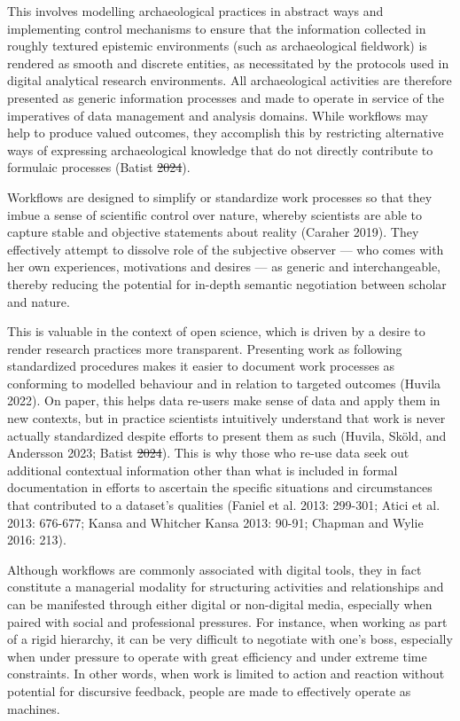 \documentclass[
]{article}
\makeatletter
\providecommand{\DIFadd}[1]{{\protect\color{blue}\uwave{#1}}} %
\providecommand{\DIFdel}[1]{{\protect\color{red}\sout{#1}}} %
\providecommand{\DIFaddbegin}{} %
\providecommand{\DIFaddend}{} %
\providecommand{\DIFdelbegin}{} %
\providecommand{\DIFdelend}{} %
\newcommand{\DIFscaledelfig}{0.5}
\newlength{\DIFdelgraphicswidth} %
\newlength{\DIFdelgraphicsheight} %
\newcommand{\DIFaddincludegraphics}[2][]{{\color{blue}\fbox{\DIFOincludegraphics[#1]{#2}}}} %
\newcommand{\DIFdelincludegraphics}[2][]{%
\sbox{\DIFdelgraphicsbox}{\DIFOincludegraphics[#1]{#2}}%
\settoboxwidth{\DIFdelgraphicswidth}{\DIFdelgraphicsbox} %
\settoboxtotalheight{\DIFdelgraphicsheight}{\DIFdelgraphicsbox} %
\scalebox{\DIFscaledelfig}{%
\parbox[b]{\DIFdelgraphicswidth}{\usebox{\DIFdelgraphicsbox}\\[-\baselineskip] \rule{\DIFdelgraphicswidth}{0em}}\llap{\resizebox{\DIFdelgraphicswidth}{\DIFdelgraphicsheight}{%
\setlength{\unitlength}{\DIFdelgraphicswidth}%
\begin{picture}(1,1)%
\thicklines\linethickness{2pt} %
{\color[rgb]{1,0,0}\put(0,0){\framebox(1,1){}}}%
{\color[rgb]{1,0,0}\put(0,0){\line( 1,1){1}}}%
{\color[rgb]{1,0,0}\put(0,1){\line(1,-1){1}}}%
\end{picture}%
}\hspace*{3pt}}} %
} %
\DeclareRobustCommand{\DIFaddbegin}{\DIFOaddbegin \let\includegraphics\DIFaddincludegraphics} %
\DeclareRobustCommand{\DIFaddend}{\DIFOaddend \let\includegraphics\DIFOincludegraphics} %
\DeclareRobustCommand{\DIFdelbegin}{\DIFOdelbegin \let\includegraphics\DIFdelincludegraphics} %
\DeclareRobustCommand{\DIFdelend}{\DIFOaddend \let\includegraphics\DIFOincludegraphics} %
\let\sout@orig\sout %
\renewcommand{\sout}[1]{\ifmmode\text{\sout@orig{\ensuremath{#1}}}\else\sout@orig{#1}\fi} %
\makeatother
\begin{document}
This involves modelling archaeological practices in abstract ways and
implementing control mechanisms to ensure that the information collected
in roughly textured epistemic environments (such as archaeological
fieldwork) is rendered as smooth and discrete entities, as necessitated
by the protocols used in digital analytical research environments. All
archaeological activities are therefore presented as generic information
processes and made to operate in service of the imperatives of data
management and analysis domains. While workflows may help to produce
valued outcomes, they accomplish this by restricting alternative ways of
expressing archaeological knowledge that do not directly contribute to
formulaic processes (Batist \DIFdelbegin \DIFdel{2024}\DIFdelend \DIFaddbegin \DIFadd{2024b}\DIFaddend ).

Workflows are designed to simplify or standardize work processes so that
they imbue a sense of scientific control over nature, whereby scientists
are able to capture stable and objective statements about reality
(Caraher 2019). They effectively attempt to dissolve \DIFaddbegin \DIFadd{the }\DIFaddend role of the
subjective observer --- who comes with her own experiences, motivations
and desires --- as generic and interchangeable, thereby reducing the
potential for in-depth semantic negotiation between scholar and nature.

This is valuable in the context of open science, which is driven by a
desire to render research practices more transparent. Presenting work as
following standardized procedures makes it easier to document work
processes as conforming to modelled behaviour and in relation to
targeted outcomes (Huvila 2022). On paper, this helps data re-users make
sense of data and apply them in new contexts, but in practice scientists
intuitively understand that work is never actually standardized despite
efforts to present them as such (Huvila, Sköld, and Andersson 2023;
Batist \DIFdelbegin \DIFdel{2024}\DIFdelend \DIFaddbegin \DIFadd{2024b}\DIFaddend ). This is why those who re-use data seek out additional
contextual information other than what is included in formal
documentation in efforts to ascertain the specific situations and
circumstances that contributed to a dataset's qualities (Faniel et al.
2013: 299-301; Atici et al. 2013: 676-677; Kansa and Whitcher Kansa
2013: 90-91; Chapman and Wylie 2016: 213).

Although workflows are commonly associated with digital tools, they in
fact constitute a managerial modality for structuring activities and
relationships and can be manifested through either digital or
non-digital media, especially when paired with social and professional
pressures. For instance, when working as part of a rigid hierarchy, it
can be very difficult to negotiate with one's boss, especially when
under pressure to operate with great efficiency and under extreme time
constraints. In other words, when work is limited to action and reaction
without potential for discursive feedback, people are made to
effectively operate as machines.
\end{document}
